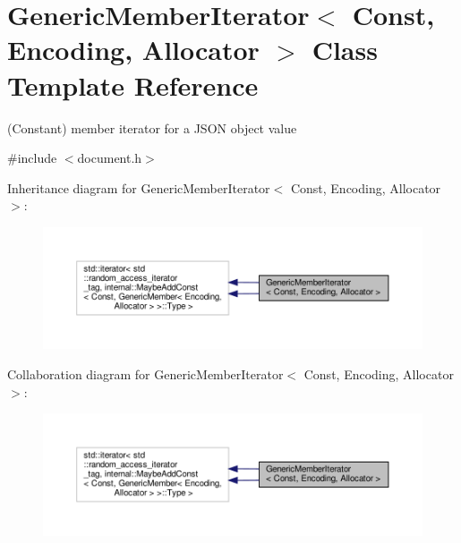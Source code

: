 \hypertarget{classGenericMemberIterator}{}\section{Generic\+Member\+Iterator$<$ Const, Encoding, Allocator $>$ Class Template Reference}
\label{classGenericMemberIterator}


(Constant) member iterator for a J\+S\+ON object value  




{\ttfamily \#include $<$document.\+h$>$}



Inheritance diagram for Generic\+Member\+Iterator$<$ Const, Encoding, Allocator $>$\+:
\nopagebreak
\begin{figure}[H]
\begin{center}
\leavevmode
\includegraphics[width=350pt]{classGenericMemberIterator__inherit__graph}
\end{center}
\end{figure}


Collaboration diagram for Generic\+Member\+Iterator$<$ Const, Encoding, Allocator $>$\+:
\nopagebreak
\begin{figure}[H]
\begin{center}
\leavevmode
\includegraphics[width=350pt]{classGenericMemberIterator__coll__graph}
\end{center}
\end{figure}

